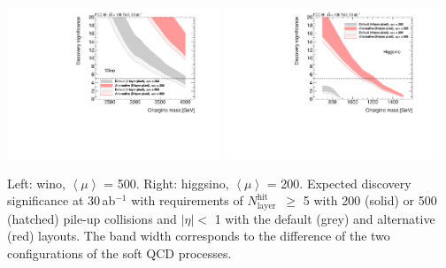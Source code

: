 \documentclass[11pt,twoside,a4paper]{cernrep}
\begin{document}
\begin{Figure}
  \centering
  \includegraphics[width=0.48\textwidth]{h_Significance_wino12_eta_5hits.pdf}
  \includegraphics[width=0.48\textwidth]{h_Significance_higgsino12_eta_5hits.pdf}
  \caption{Left: wino, $\left< \mu\right>$ {=} 500. Right: higgsino, $\left< \mu\right>$ {=} 200. Expected discovery significance at 30\,ab${}^{-1}$ with requirements of \ensuremath{N_{\mathrm{layer}}^{\mathrm{hit}}}~$\geq$ 5 with 200 (solid) or 500 (hatched) pile-up collisions and $|\eta|<$ 1 with the default (grey) and alternative (red) layouts.
            The band width corresponds to the difference of the two configurations of the soft QCD processes.}
  \label{figure:SignificanceEta1}
\end{Figure}



\end{document}
